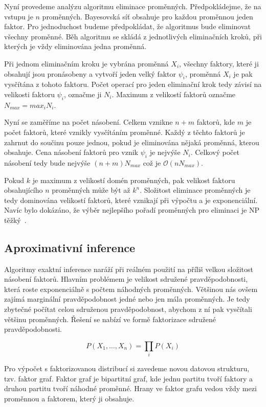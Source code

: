 Nyní provedeme analýzu algoritmu eliminace proměnných.
Předpokládejme, že na vstupu je $n$ proměnných.
Bayesovská síť obsahuje pro každou proměnnou jeden faktor.
Pro jednoduchost budeme předpokládat, že algoritmus bude eliminovat všechny proměnné.
Běh algoritmu se skládá z jednotlivých eliminačních kroků, při kterých je vždy eliminována jedna proměnná.

Při jednom eliminačním kroku je vybrána proměnná $X_i$, všechny faktory, které ji obsahují jsou pronásobeny a vytvoří jeden velký faktor $\psi_i$, proměnná $X_i$ je pak vysčítána z tohoto faktoru.
Počet operací pro jeden eliminační krok tedy závisí na velikosti faktoru $\psi_i$, označme ji $N_i$.
Maximum z velikostí faktorů označme $N_{max} = max_i N_i$.

Nyní se zaměříme na počet násobení.
Celkem vznikne $n+m$ faktorů, kde $m$ je počet faktorů, které vznikly vysčítáním proměnné.
Každý z těchto faktorů je zahrnut do součinu pouze jednou, pokud je eliminována nějaká proměnná, kterou obsahuje.
Cena násobení faktorů pro vznik $\psi_i$ je nejvýše $N_i$.
Celkový počet násobení tedy bude nejvýše $(n+m)N_{max}$ což je $\mathcal{O}(nN_{max})$.

Pokud $k$ je maximum z velikostí domén proměnných, pak velikost faktoru obsahujícího $n$ proměnných může být až $k^n$.
Složitost eliminace proměnných je tedy dominována velikostí faktorů, které vznikají při výpočtu a je exponenciální.
Navíc bylo dokázáno, že výběr nejlepšího pořadí proměnných pro eliminaci je NP těžký~\cite{arnborg1987complexity}.

\subsection{Aproximativní inference}

Algoritmy exaktní inference naráží při reálném použití na příliš velkou složitost násobení faktorů.
Hlavním problémem je velikost sdružené pravděpodobnosti, která roste exponenciálně s počtem náhodných proměnných.
Většinou nás ovšem zajímá marginální pravděpodobnost jedné nebo jen mála proměnných.
Je tedy zbytečné počítat celou sdruženou pravděpodobnost, abychom z ní pak vysčítali většinu proměnných.
Řešení se nabízí ve formě faktorizace sdružené pravděpodobnosti.

\begin{equation*}
    P(X_1, \dots, X_n) = \prod_i P(X_i)
\end{equation*}

Pro výpočet s faktorizovanou distribucí si zavedeme novou datovou strukturu, tzv. faktor graf.
Faktor graf je bipartitní graf, kde jednu partitu tvoří faktory a druhou partitu tvoří náhodné proměnné.
Hrany ve faktor grafu vedou vždy mezi proměnnou a faktorem, který ji obsahuje.

